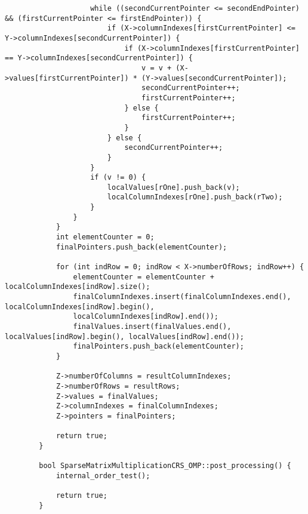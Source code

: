 \documentclass[a4paper, 14pt]{article}
\begin{document}
\begin{verbatim}
					while ((secondCurrentPointer <= secondEndPointer) && (firstCurrentPointer <= firstEndPointer)) {
						if (X->columnIndexes[firstCurrentPointer] <= Y->columnIndexes[secondCurrentPointer]) {
							if (X->columnIndexes[firstCurrentPointer] == Y->columnIndexes[secondCurrentPointer]) {
								v = v + (X->values[firstCurrentPointer]) * (Y->values[secondCurrentPointer]);
								secondCurrentPointer++;
								firstCurrentPointer++;
							} else {
								firstCurrentPointer++;
							}
						} else {
							secondCurrentPointer++;
						}
					}
					if (v != 0) {
						localValues[rOne].push_back(v);
						localColumnIndexes[rOne].push_back(rTwo);
					}
				}
			}
			int elementCounter = 0;
			finalPointers.push_back(elementCounter);
			
			for (int indRow = 0; indRow < X->numberOfRows; indRow++) {
				elementCounter = elementCounter + localColumnIndexes[indRow].size();
				finalColumnIndexes.insert(finalColumnIndexes.end(), localColumnIndexes[indRow].begin(),
				localColumnIndexes[indRow].end());
				finalValues.insert(finalValues.end(), localValues[indRow].begin(), localValues[indRow].end());
				finalPointers.push_back(elementCounter);
			}
			
			Z->numberOfColumns = resultColumnIndexes;
			Z->numberOfRows = resultRows;
			Z->values = finalValues;
			Z->columnIndexes = finalColumnIndexes;
			Z->pointers = finalPointers;
			
			return true;
		}
		
		bool SparseMatrixMultiplicationCRS_OMP::post_processing() {
			internal_order_test();
			
			return true;
		}
	\end{verbatim}
	
\end{document}
